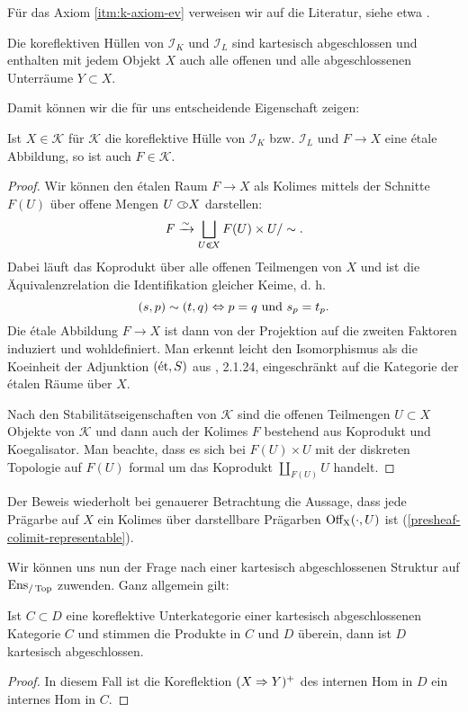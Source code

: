 Für das Axiom \ref{itm:k-axiom-ev} verweisen wir auf die Literatur,
siehe etwa \cite{??}.

\begin{kor}
  Die koreflektiven Hüllen von $\mathcal{I}_K$ und $\mathcal{I}_L$
  sind kartesisch abgeschlossen und enthalten mit jedem Objekt $X$
  auch alle offenen und alle abgeschlossenen Unterräume $Y \subset X$.
\end{kor}

Damit können wir die für uns entscheidende Eigenschaft zeigen:
\begin{prop} \label{k-etale-closed}
  Ist $X \in \mathcal{K}$ für $\mathcal{K}$ die koreflektive Hülle von
  $\mathcal{I}_K$ bzw. $\mathcal{I}_L$ und $F \to X$ eine étale
  Abbildung, so ist auch $F \in \mathcal{K}$.
\end{prop}
\begin{proof}
  Wir können den étalen Raum $F \to X$ als Kolimes mittels der
  Schnitte $F(U)$ über offene Mengen $U \subset\kern-0.58em\circ X$ darstellen:
  \[ F \xrightarrow[]{\sim} \bigsqcup_{U \subset\kern-0.58em\circ X} F(U) \times U / \sim. \]
  Dabei läuft das Koprodukt über alle offenen Teilmengen von $X$ und
  ist die Äquivalenzrelation die Identifikation gleicher Keime, d. h.
  \[ (s, p) \sim (t, q) \Leftrightarrow p = q \text{ und } s_p = t_p. \]
  Die étale Abbildung $F \to X$ ist dann von der Projektion auf die
  zweiten Faktoren induziert und wohldefiniert. Man erkennt leicht den
  Isomorphismus als die Koeinheit der Adjunktion $(\mathrm{\acute{e}t}, S)$ aus
  \cite{TG}, 2.1.24, eingeschränkt auf die Kategorie der étalen Räume
  über $X$.

  Nach den Stabilitätseigenschaften von $\mathcal{K}$ sind die offenen
  Teilmengen $U \subset X$ Objekte von $\mathcal{K}$ und dann auch der
  Kolimes $F$ bestehend aus Koprodukt und Koegalisator. Man beachte,
  dass es sich bei $F(U) \times U$ mit der diskreten Topologie auf
  $F(U)$ formal um das Koprodukt $\coprod_{F(U)} U$ handelt.
\end{proof}
\begin{bem}
  Der Beweis wiederholt bei genauerer Betrachtung die Aussage, dass
  jede Prägarbe auf $X$ ein Kolimes über darstellbare Prägarben
  $\operatorname{Off_X}(\cdot, U)$ ist (\ref{presheaf-colimit-representable}).
\end{bem}

Wir können uns nun der Frage nach einer kartesisch abgeschlossenen
Struktur auf $\operatorname{Ens}_{/\operatorname{Top}}$ zuwenden. Ganz allgemein gilt:
\begin{prop}
  Ist $C \subset D$ eine koreflektive Unterkategorie einer kartesisch
  abgeschlossenen Kategorie $C$ und stimmen die Produkte in $C$ und
  $D$ überein, dann ist $D$ kartesisch abgeschlossen.
\end{prop}
\begin{proof}
  In diesem Fall ist die Koreflektion $(X \Rightarrow Y)^+$ des internen
  Hom in $D$ ein internes Hom in $C$.
\end{proof}

